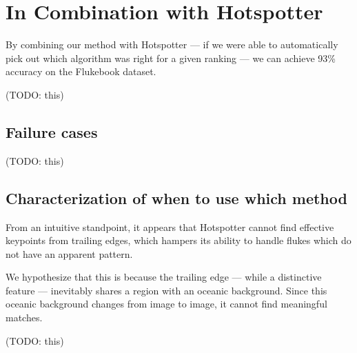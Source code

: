 \section{In Combination with Hotspotter}

By combining our method with Hotspotter --- if we were able to automatically pick out which algorithm was right for a given ranking --- we can achieve 93\% accuracy on the Flukebook dataset.

(TODO: this)

\subsection{Failure cases}

(TODO: this)

\subsection{Characterization of when to use which method}

From an intuitive standpoint, it appears that Hotspotter cannot find effective keypoints from trailing edges, which hampers its ability to handle flukes which do not have an apparent pattern.

We hypothesize that this is because the trailing edge --- while a distinctive feature --- inevitably shares a region with an oceanic background.
Since this oceanic background changes from image to image, it cannot find meaningful matches.

(TODO: this)


